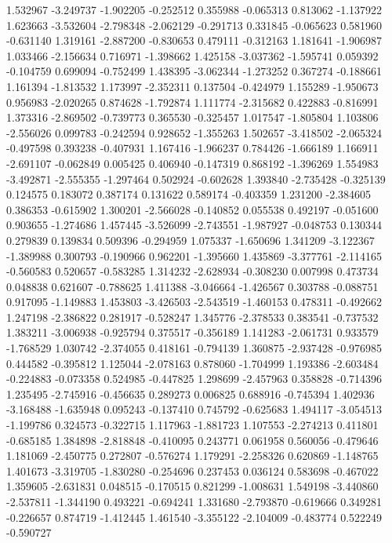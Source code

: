 1.532967
-3.249737
-1.902205
-0.252512
0.355988
-0.065313
0.813062
-1.137922
1.623663
-3.532604
-2.798348
-2.062129
-0.291713
0.331845
-0.065623
0.581960
-0.631140
1.319161
-2.887200
-0.830653
0.479111
-0.312163
1.181641
-1.906987
1.033466
-2.156634
0.716971
-1.398662
1.425158
-3.037362
-1.595741
0.059392
-0.104759
0.699094
-0.752499
1.438395
-3.062344
-1.273252
0.367274
-0.188661
1.161394
-1.813532
1.173997
-2.352311
0.137504
-0.424979
1.155289
-1.950673
0.956983
-2.020265
0.874628
-1.792874
1.111774
-2.315682
0.422883
-0.816991
1.373316
-2.869502
-0.739773
0.365530
-0.325457
1.017547
-1.805804
1.103806
-2.556026
0.099783
-0.242594
0.928652
-1.355263
1.502657
-3.418502
-2.065324
-0.497598
0.393238
-0.407931
1.167416
-1.966237
0.784426
-1.666189
1.166911
-2.691107
-0.062849
0.005425
0.406940
-0.147319
0.868192
-1.396269
1.554983
-3.492871
-2.555355
-1.297464
0.502924
-0.602628
1.393840
-2.735428
-0.325139
0.124575
0.183072
0.387174
0.131622
0.589174
-0.403359
1.231200
-2.384605
0.386353
-0.615902
1.300201
-2.566028
-0.140852
0.055538
0.492197
-0.051600
0.903655
-1.274686
1.457445
-3.526099
-2.743551
-1.987927
-0.048753
0.130344
0.279839
0.139834
0.509396
-0.294959
1.075337
-1.650696
1.341209
-3.122367
-1.389988
0.300793
-0.190966
0.962201
-1.395660
1.435869
-3.377761
-2.114165
-0.560583
0.520657
-0.583285
1.314232
-2.628934
-0.308230
0.007998
0.473734
0.048838
0.621607
-0.788625
1.411388
-3.046664
-1.426567
0.303788
-0.088751
0.917095
-1.149883
1.453803
-3.426503
-2.543519
-1.460153
0.478311
-0.492662
1.247198
-2.386822
0.281917
-0.528247
1.345776
-2.378533
0.383541
-0.737532
1.383211
-3.006938
-0.925794
0.375517
-0.356189
1.141283
-2.061731
0.933579
-1.768529
1.030742
-2.374055
0.418161
-0.794139
1.360875
-2.937428
-0.976985
0.444582
-0.395812
1.125044
-2.078163
0.878060
-1.704999
1.193386
-2.603484
-0.224883
-0.073358
0.524985
-0.447825
1.298699
-2.457963
0.358828
-0.714396
1.235495
-2.745916
-0.456635
0.289273
0.006825
0.688916
-0.745394
1.402936
-3.168488
-1.635948
0.095243
-0.137410
0.745792
-0.625683
1.494117
-3.054513
-1.199786
0.324573
-0.322715
1.117963
-1.881723
1.107553
-2.274213
0.411801
-0.685185
1.384898
-2.818848
-0.410095
0.243771
0.061958
0.560056
-0.479646
1.181069
-2.450775
0.272807
-0.576274
1.179291
-2.258326
0.620869
-1.148765
1.401673
-3.319705
-1.830280
-0.254696
0.237453
0.036124
0.583698
-0.467022
1.359605
-2.631831
0.048515
-0.170515
0.821299
-1.008631
1.549198
-3.440860
-2.537811
-1.344190
0.493221
-0.694241
1.331680
-2.793870
-0.619666
0.349281
-0.226657
0.874719
-1.412445
1.461540
-3.355122
-2.104009
-0.483774
0.522249
-0.590727
